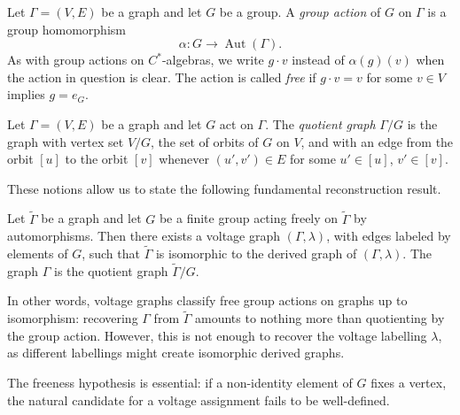 \begin{definition}
    \label{def:group-action-on-graph}
    Let \( \Gamma = (V,E) \) be a graph and let \( G \) be a group. A
    \emph{group action} of \( G \) on \( \Gamma \) is a group
    homomorphism
    \[
        \alpha \colon G \to \operatorname{Aut}(\Gamma).
    \]
    As with group actions on \( C^{*} \)-algebras, we write \( g \cdot v \)
    instead of \( \alpha(g)(v) \) when the action in question is clear.
    The action is called \emph{free} if \( g \cdot v = v \) for some
    \( v \in V \) implies \( g = e_G \).
\end{definition}

\begin{definition}
    \label{def:quotient-graph}
    Let \( \Gamma = (V,E) \) be a graph and let \( G \) act on
    \( \Gamma \). The \emph{quotient graph} \( \Gamma/G \) is the
    graph with vertex set \( V/G \), the set of orbits of \( G \) on
    \( V \), and with an edge from the orbit \( [u] \) to the orbit
    \( [v] \) whenever \( (u',v') \in E \) for some
    \( u' \in [u] \), \( v' \in [v] \).
\end{definition}

These notions allow us to state the following fundamental reconstruction result.

\begin{theorem}
    \label{thm:gross-and-tucker}
    Let \( \widetilde\Gamma \) be a graph and let \( G \) be a finite group
    acting freely on \( \widetilde\Gamma \) by automorphisms. Then there
    exists a voltage graph \( (\Gamma,\lambda) \), with edges labeled
    by elements of \( G \), such that \( \widetilde\Gamma \) is isomorphic
    to the derived graph of \( (\Gamma,\lambda) \). The graph
    \( \Gamma \) is the quotient graph \( \widetilde\Gamma / G \).
\end{theorem}

In other words, voltage graphs classify free group actions on graphs
up to isomorphism: recovering \( \Gamma \) from
\( \widetilde\Gamma \) amounts to nothing more than quotienting by the
group action. However, this is not enough to recover the voltage labelling
\( \lambda \), as different labellings might create isomorphic derived graphs.

\begin{remark}
    The freeness hypothesis is essential: if a non-identity element
    of \( G \) fixes
    a vertex, the natural candidate for a voltage assignment fails to
    be well-defined.
\end{remark}

